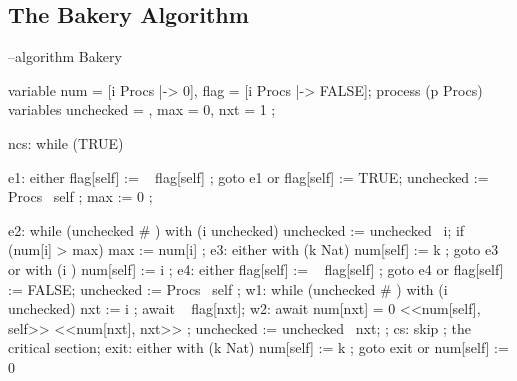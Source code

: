 \documentclass[fleqn,leqno]{article}
\begin{document}
\subsection*{The Bakery Algorithm}


\begin{pcal}
--algorithm Bakery 
{ variable num = [i \in Procs |-> 0], flag = [i \in Procs |-> FALSE];
  process (p \in Procs)
    variables unchecked = {}, max = 0, nxt = 1 ;
    { ncs: while (TRUE) 
            { e1:   either { flag[self] := ~ flag[self] ;
                             goto e1 }
                    or     { flag[self] := TRUE;
                             unchecked := Procs \ {self} ;
                             max := 0
                           } ;
                    
              e2:   while (unchecked # {}) 
                      { with (i \in unchecked) 
                          { unchecked := unchecked \ {i};
                            if (num[i] > max) { max := num[i] }
                          }
                      };
              e3:   either { with (k \in Nat) { num[self] := k } ;
                             goto e3 }
                    or     { with (i ) 
                               { num[self] := i }
                           } ;
              e4:   either { flag[self] := ~ flag[self] ;
                             goto e4 }
                    or     { flag[self] := FALSE;
                               unchecked := Procs \ {self} 
                           } ;
              w1:   while (unchecked # {}) 
                      {     with (i \in unchecked) { nxt := i };
                            await ~ flag[nxt];
                        w2: await \/ num[nxt] = 0
                                  \/ <<num[self], self>> \prec <<num[nxt], nxt>> ;
                            unchecked := unchecked \ {nxt};
                      } ;
              cs:   skip ;  \* the critical section;
              exit: either { with (k \in Nat) { num[self] := k } ;
                             goto exit }
                    or     { num[self] := 0 } 
            }
    }
}
\end{pcal}
\end{document}
